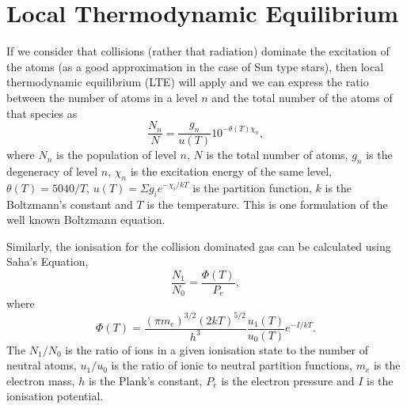 \documentclass[dvips,12pt,a4paper]{report}
\begin{document}
{\section {Local Thermodynamic Equilibrium}
\label{LTE}
If we consider that collisions (rather that radiation) dominate the excitation of the atoms (as a good approximation in the case of Sun type stars), then local thermodynamic equilibrium (LTE) will apply and we can express the ratio between the number of atoms in a level $n$ and the total number of the atoms of that species as
\begin{equation}
\label{Boltz}
 \frac{N_n}{N}=\frac{g_n}{u(T)}10^{-\theta(T)\chi_n},
\end{equation}
where $N_n$ is the population of level $n$, $N$ is the total number of atoms, $g_n$ is the degeneracy of level $n$, $\chi_n$ is the excitation energy of the same level, $\theta(T)=5040/T$, $u(T)=\Sigma g_ie^{-\chi_i/kT}$ is the partition function, $k$ is the Boltzmann's constant and $T$ is the temperature. This is one formulation of the well known Boltzmann equation. %

Similarly, the ionisation for the collision dominated gas can be calculated using Saha's Equation,
\begin{equation}
\label{Saha}
\frac{N_1}{N_0}=\frac{\Phi(T)}{P_e},
\end{equation}
where 
\begin {equation}
\Phi(T)=\frac{(\pi m_e)^{3/2}(2kT)^{5/2}}{h^3}\frac{u_1(T)}{u_0(T)}e^{-I/kT}.
\end {equation}
The $N_1/N_0$ is the ratio of ions in a given ionisation state  to the number of neutral atoms, $u_1/u_0$ is the ratio of ionic to neutral partition functions, $m_e$ is the electron mass, $h$ is the Plank's constant, $P_e$ is the electron pressure and $I$ is the ionisation potential.





}
\end{document}
